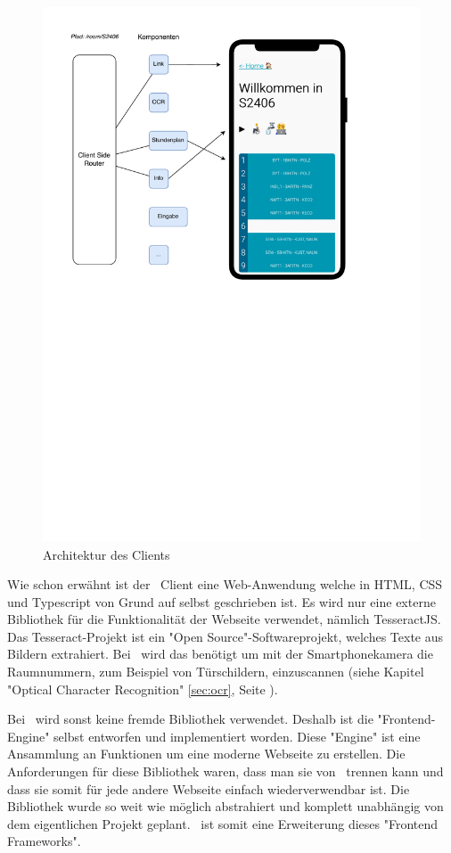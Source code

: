 
\begin{figure}[H]
    \centering
    \includegraphics[width=120mm]{media/Intro/client_arch.svg.pdf}
    \caption{Architektur des Clients}
\end{figure}

Wie schon erwähnt ist der \ZELIA\ Client eine Web-Anwendung welche in HTML, CSS und Typescript von Grund auf selbst geschrieben ist. Es wird nur eine externe Bibliothek für die Funktionalität der Webseite verwendet, nämlich TesseractJS. Das Tesseract-Projekt ist ein "Open Source"-Softwareprojekt, welches Texte aus Bildern extrahiert. Bei \ZELIA\ wird das benötigt um mit der Smartphonekamera die Raumnummern, zum Beispiel von Türschildern, einzuscannen (siehe Kapitel "Optical Character Recognition" \ref{sec:ocr}, Seite \pageref{sec:ocr}).

Bei \ZELIA\ wird sonst keine fremde Bibliothek verwendet. Deshalb ist die "Frontend-Engine" selbst entworfen und implementiert worden. Diese "Engine" ist eine Ansammlung an Funktionen um eine moderne Webseite zu erstellen. Die Anforderungen für diese Bibliothek waren, dass man sie von \ZELIA\ trennen kann und dass sie somit für jede andere Webseite einfach wiederverwendbar ist. Die Bibliothek wurde so weit wie möglich abstrahiert und komplett unabhängig von dem eigentlichen Projekt geplant. \ZELIA\ ist somit eine Erweiterung dieses "Frontend Frameworks".

